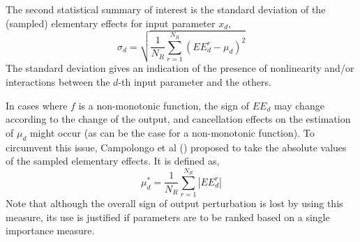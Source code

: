 The second statistical summary of interest is the standard deviation of the (sampled) elementary effects for input parameter $x_d$,
\begin{equation}
	\sigma_d = \sqrt{\frac{1}{N_R} \sum_{r = 1}^{N_R} (EE^r_d - \mu_d)^2}
	\label{eq:sa_morris_sd}
\end{equation} 
The standard deviation gives an indication of the presence of nonlinearity and/or interactions between the $d$-th input parameter and the others.

In cases where $f$ is a non-monotonic function,
the sign of $EE_d$ may change according to the change of the output,
and cancellation effects on the estimation of $\mu_d$ might occur 
(as can be the case for a non-monotonic function).
To circumvent this issue,
Campolongo et al (\cite{Campolongo2011}) proposed to take the absolute values of the sampled elementary effects.
It is defined as,
\begin{equation}
	\mu^*_d = \frac{1}{N_R} \sum_{r = 1}^{N_R} |EE^r_d|
	\label{eq:sa_morris_mustar}
\end{equation}
Note that although the overall sign of output perturbation is lost by using this measure,
its use is justified if parameters are to be ranked based on a single importance measure.

